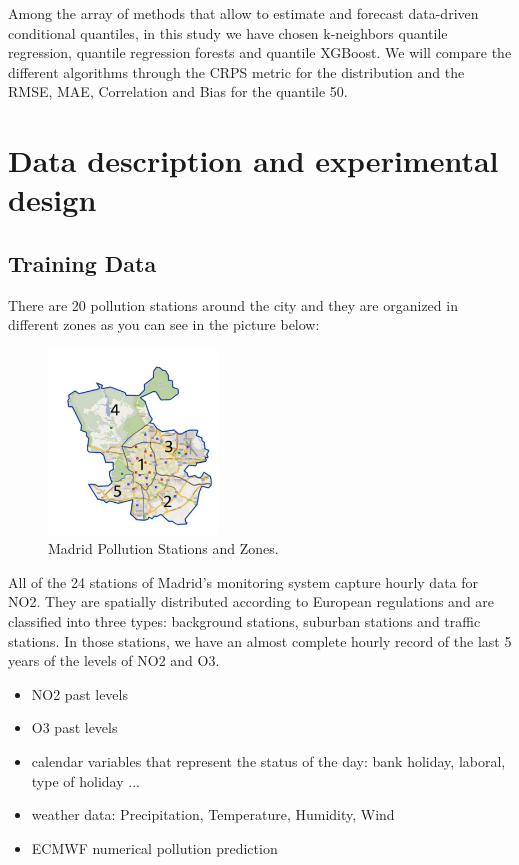 \documentclass[a4paper,twocolumn,5p]{elsarticle}
\begin{document}
Among the array of methods that allow to estimate and forecast
data-driven conditional quantiles, in this study we have chosen
k-neighbors quantile regression, quantile regression forests and quantile XGBoost. 
We will compare the different algorithms through the CRPS metric for the 
distribution and the RMSE, MAE, Correlation and Bias for the quantile 50.

\section{Data description and experimental design}

\subsection{Training Data}

There are 20 pollution stations around the city and they are organized in different
zones as you can see in the picture below:

\begin{figure}
  \caption{Madrid Pollution Stations and Zones.}
  \centering
      \includegraphics[width=0.4\textwidth]{zonas_madrid}
\end{figure}

All of the 24 stations of Madrid’s monitoring system capture hourly data for NO2. 
They are spatially distributed according to European regulations and are classified into three types: 
background stations, suburban stations and traffic stations. In those stations, we have an almost complete 
hourly record of the last 5 years of the levels of NO2 and O3.


\begin{itemize}
  \item NO2 past levels
  \item O3 past levels
  \item calendar variables that represent the status of the day: bank holiday, laboral, type of holiday ...
  \item weather data: Precipitation, Temperature, Humidity, Wind
  \item ECMWF numerical pollution prediction
\end{itemize} 
\end{document}

